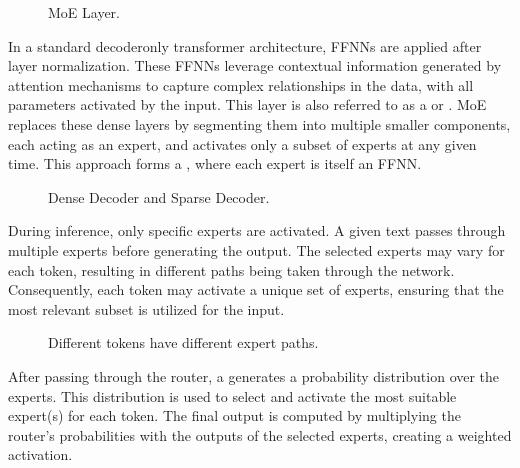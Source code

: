 \documentclass[letterpaper,11pt,english]{sphinxmanual}
\begin{document}
\begin{figure}[htbp]
\centering
\capstart

\noindent{}
\caption{MoE Layer.}\label{\detokenize{pretraining:id23}}\end{figure}

\sphinxAtStartPar
In a standard decoder\sphinxhyphen{}only transformer architecture, FFNNs are applied
after layer normalization. These FFNNs leverage contextual information
generated by attention mechanisms to capture complex relationships in
the data, with all parameters activated by the input. This layer is also
referred to as a  or . MoE replaces these
dense layers by segmenting them into multiple smaller components, each
acting as an expert, and activates only a subset of experts at any given
time. This approach forms a , where each expert is
itself an FFNN.

\begin{figure}[htbp]
\centering
\capstart

\noindent{}
\caption{Dense Decoder and Sparse Decoder.}\label{\detokenize{pretraining:id24}}\end{figure}

\sphinxAtStartPar
During inference, only specific experts are activated. A given text
passes through multiple experts before generating the output. The
selected experts may vary for each token, resulting in different paths
being taken through the network. Consequently, each token may activate a
unique set of experts, ensuring that the most relevant subset is
utilized for the input.

\begin{figure}[htbp]
\centering
\capstart

\noindent{}
\caption{Different tokens have different expert paths.}\label{\detokenize{pretraining:id25}}\end{figure}

\sphinxAtStartPar
After passing through the router, a  generates a
probability distribution over the experts. This distribution is used to
select and activate the most suitable expert(s) for each token. The
final output is computed by multiplying the router’s probabilities with
the outputs of the selected experts, creating a weighted activation.
\end{document}
